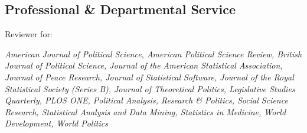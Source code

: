 \documentclass[margin,line,12pt]{res}
\newenvironment{list1}{
  \begin{list}{\ding{113}}{%
      \setlength{\itemsep}{0in}
      \setlength{\parsep}{0in} \setlength{\parskip}{0in}
      \setlength{\topsep}{0in} \setlength{\partopsep}{0in} 
      \setlength{\leftmargin}{0.83 cm}}}{\end{list}}
\begin{document}
\begin{resume}

\section{\sc Professional \& Departmental Service}

Reviewer for:
\begin{list1}
\item[] \emph{American Journal of Political Science, American Political Science Review,  British Journal of Political Science, Journal of the American Statistical Association, Journal of Peace Research, Journal of Statistical Software, Journal of the Royal Statistical Society (Series B), Journal of Theoretical Politics, Legislative Studies Quarterly, PLOS ONE, Political Analysis, Research \& Politics, Social Science Research,  Statistical Analysis and Data Mining, Statistics in Medicine, World Development, World Politics}

\end{list1}
\end{resume}
\end{document}
